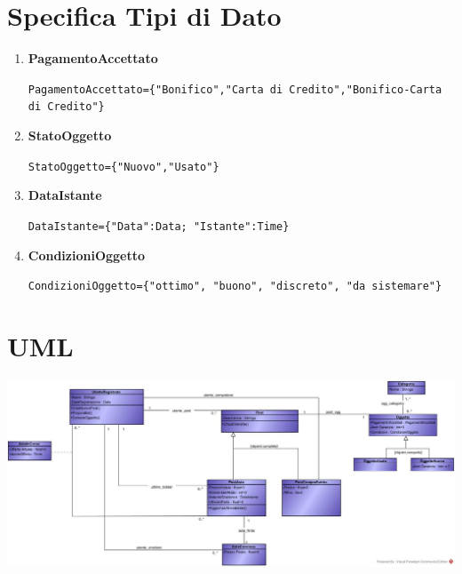\documentclass{article}
\begin{document}
    
    

\newpage
\section{Specifica Tipi di Dato}

\begin{enumerate}
    \item \textbf{PagamentoAccettato}
    
    \texttt{PagamentoAccettato=\{"Bonifico","Carta di Credito","Bonifico-Carta di Credito"\}}
    
    \item \textbf{StatoOggetto}
    
    \texttt{StatoOggetto=\{"Nuovo","Usato"\}}
    
    \item \textbf{DataIstante}
    
    \texttt{DataIstante=\{"Data":Data; "Istante":Time\}}
    
    \item \textbf{CondizioniOggetto}
    
    \texttt{CondizioniOggetto=\{"ottimo", "buono", "discreto", "da sistemare"\}}
\end{enumerate}
\newpage
\section{UML}
\includegraphics[width=\textwidth]{UML.jpg}
\end{document}
